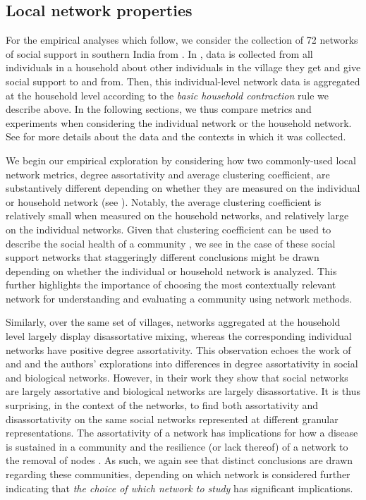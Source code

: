 \subsection{Local network properties}\label{subsub:local}

For the empirical analyses which follow, we consider the collection of 72 networks of social support in southern India from \citet{banerjee2013}. In \cite{banerjee2013}, data is collected from all individuals in a household about other individuals in the village they get and give social support to and from. Then, this individual-level network data is aggregated at the household level according to the \textit{basic household contraction} rule we describe above. In the following sections, we thus compare metrics and experiments when considering the individual network or the household network. See  for more details about the data and the contexts in which it was collected. 

We begin our empirical exploration by considering how two commonly-used local network metrics, degree assortativity and average clustering coefficient, are substantively different depending on whether they are measured on the individual or household network (see ). Notably, the average clustering coefficient is relatively small when measured on the household networks, and relatively large on the individual networks. Given that clustering coefficient can be used to describe the social health of a community \citep[e.g.,][]{cartwright1956,bearman2004}, we see in the case of these social support networks that staggeringly different conclusions might be drawn depending on whether the individual or household network is analyzed. This further highlights the importance of choosing the most contextually relevant network for understanding and evaluating a community using network methods.

Similarly, over the same set of villages, networks aggregated at the household level largely display disassortative mixing, whereas the corresponding individual networks have positive degree assortativity. This observation echoes the work of \cite{newman2002assortative} and \cite{newman2003social} and the authors' explorations into differences in degree assortativity in social and biological networks. However, in their work they show that social networks are largely assortative and biological networks are largely disassortative. It is thus surprising, in the context of the \citeauthor{banerjee2013} networks, to find both assortativity and disassortativity on the same social networks represented at different granular representations. The assortativity of a network has implications for how a disease is sustained in a community and the resilience (or lack thereof) of a network to the removal of nodes \citep{newman2003social}. As such, we again see that distinct conclusions are drawn regarding these communities, depending on which network is considered further indicating that \textit{the choice of which network to study} has significant implications. 


